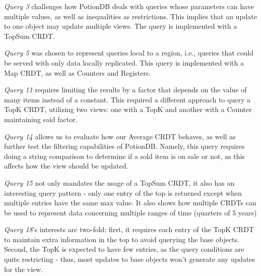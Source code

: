 \documentclass[sigplan,review,anonymous]{acmart}
\begin{document}
\begin{compactitem}
	\item \emph{Query 3} challenges how PotionDB deals with queries whose parameters can have multiple values, as well as inequalities as restrictions. 
	This implies that an update to one object may update multiple views. 
	The query is implemented with a TopSum CRDT. %
	\item \emph{Query 5} was chosen to represent queries local to a region, i.e., queries that could be served with only data locally replicated. %
	This query is implemented with a Map CRDT, as well as Counters and Registers.
	\item \emph{Query 11} requires limiting the results by a factor that depends on the value of many items instead of a constant.
	This required a different approach to query a TopK CRDT, utilizing two views: one with a TopK and another with a Counter maintaining said factor.
	\item \emph{Query 14} allows us to evaluate how our Average CRDT behaves, as well as further test the filtering capabilities of PotionDB.
	Namely, this query requires doing a string comparison to determine if a sold item is on sale or not, as this affects how the view should be updated.
	\item \emph{Query 15} not only mandates the usage of a TopSum CRDT, it also has an interesting query pattern - only one entry of the top is returned except when multiple entries have the same max value.
	It also shows how multiple CRDTs can be used to represent data concerning multiple ranges of time (quarters of 5 years)
	\item \emph{Query 18}'s interests are two-fold: %
	first, it requires each entry of the TopK CRDT to maintain extra information in the top to avoid querying the base objects.
	Second, the TopK is expected to have few entries, as the query conditions are quite restricting - thus, most updates to base objects won't generate any updates for the view.
\end{compactitem}
\end{document}
